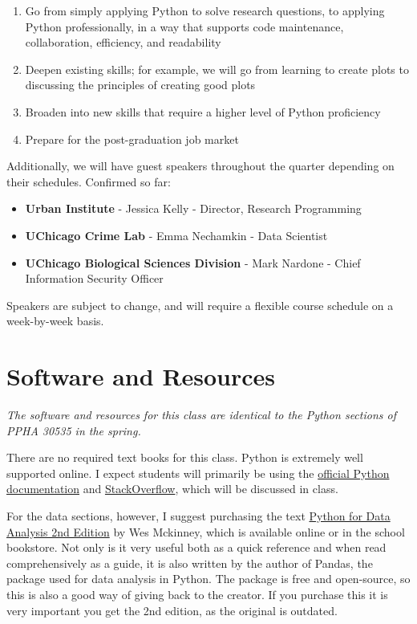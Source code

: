 \documentclass{article}
\begin{document}
\begin{enumerate}
	\item Go from simply applying Python to solve research questions, to applying Python professionally, in a way that supports code maintenance, collaboration, efficiency, and readability
	\item Deepen existing skills; for example, we will go from learning to create plots to discussing the principles of creating good plots
	\item Broaden into new skills that require a higher level of Python proficiency 
	\item Prepare for the post-graduation job market
\end{enumerate}

\noindent Additionally, we will have guest speakers throughout the quarter depending on their schedules.  Confirmed so far:

\begin{itemize}
	\item \textbf{Urban Institute} - Jessica Kelly - Director, Research Programming
	\item \textbf{UChicago Crime Lab} - Emma Nechamkin - Data Scientist
	\item \textbf{UChicago Biological Sciences Division} - Mark Nardone - Chief Information Security Officer 
\end{itemize}

\noindent Speakers are subject to change, and will require a flexible course schedule on a week-by-week basis.


\section*{Software and Resources}
\emph{The software and resources for this class are identical to the Python sections of PPHA 30535 in the spring.}

There are no required text books for this class.  Python is extremely well supported online.  I expect students will primarily be using the \href{https://docs.python.org/3/}{official Python documentation} and \href{https://stackoverflow.com/}{StackOverflow}, which will be discussed in class.  

For the data sections, however, I suggest purchasing the text \href{https://www.amazon.com/Python-Data-Analysis-Wrangling-IPython/dp/1491957662/ref=sr_1_3?ie=UTF8\&qid=1550574627\&sr=8-3\&keywords=python+for+data+analysis+2nd}{Python for Data Analysis 2nd Edition} by Wes Mckinney, which is available online or in the school bookstore.  Not only is it very useful both as a quick reference and when read comprehensively as a guide, it is also written by the author of Pandas, the package used for data analysis in Python.  The package is free and open-source, so this is also a good way of giving back to the creator.  If you purchase this it is very important you get the 2nd edition, as the original is outdated.
\end{document}
